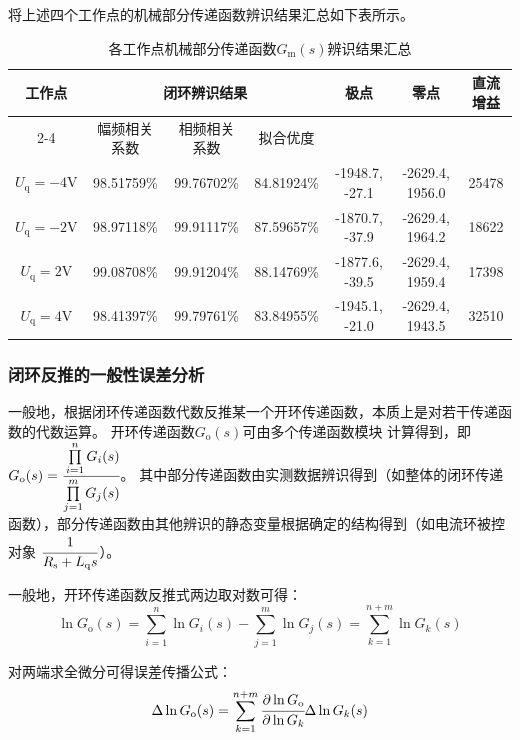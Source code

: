 将上述四个工作点的机械部分传递函数辨识结果汇总如下表所示。
\begin{table}[H]
    \centering
    \begin{tabular}{|c|c|c|c|c|c|c|}
        \hline
        \multirow{2}{*}{工作点} & \multicolumn{3}{c|}{闭环辨识结果} & \multirow{2}{*}{极点} & \multirow{2}{*}{零点} & \multirow{2}{*}{直流增益} \\
        \cline{2-4}
        & 幅频相关系数 & 相频相关系数 & 拟合优度 & & & \\
        \hline
        \(U_{\mathrm{q}}=-4\text{V}\) & 98.51759\% & 99.76702\% & 84.81924\% & -1948.7, -27.1 & -2629.4, 1956.0 & 25478\\
        \hline
        \(U_{\mathrm{q}}=-2\text{V}\) & 98.97118\% & 99.91117\% & 87.59657\% & -1870.7, -37.9 & -2629.4, 1964.2 & 18622\\
        \hline
        \(U_{\mathrm{q}}=2\text{V}\)  & 99.08708\% & 99.91204\% & 88.14769\% & -1877.6, -39.5 & -2629.4, 1959.4 & 17398\\
        \hline
        \(U_{\mathrm{q}}=4\text{V}\)  & 98.41397\% & 99.79761\% & 83.84955\% & -1945.1, -21.0  & -2629.4, 1943.5 & 32510\\
        \hline
    \end{tabular}
    \caption{各工作点机械部分传递函数\(G_{\mathrm{m}}(s)\)辨识结果汇总}
    \label{tab:各工作点Gm辨识结果汇总}
\end{table}

\subsubsection{闭环反推的一般性误差分析\label{sec:闭环反推的一般性误差分析}}
一般地，根据闭环传递函数代数反推某一个开环传递函数，本质上是对若干传递函数的代数运算。
开环传递函数\(G_{\mathrm{o}}(s)\)可由多个传递函数模块
计算得到，即\(G_{\mathrm{o}}(s)=\cfrac{\prod\limits_{i=1}^nG_i(s)}{\prod\limits_{j=1}^mG_j(s)}\)。
其中部分传递函数由实测数据辨识得到（如整体的闭环传递函数），部分传递函数由其他辨识的静态变量根据确定的结构得到（如电流环被控对象
\(\cfrac{1}{R_{\mathrm{s}}+L_{\mathrm{q}}s}\)）。

一般地，开环传递函数反推式两边取对数可得：
\begin{equation*}
    \ln G_{\mathrm{o}}(s)=\sum\limits_{i=1}^n\ln G_i(s) - \sum\limits_{j=1}^m\ln G_j(s)=
    \sum\limits_{k=1}^{n+m}\ln G_k(s)
\end{equation*}

对两端求全微分可得误差传播公式：
\begin{equation*}
    \Delta\ln G_{\mathrm{o}}(s)=\sum_{k=1}^{n+m}\cfrac{\partial\ln G_{\mathrm{o}}}{\partial\ln G_k}\Delta\ln G_k(s)
\end{equation*}


